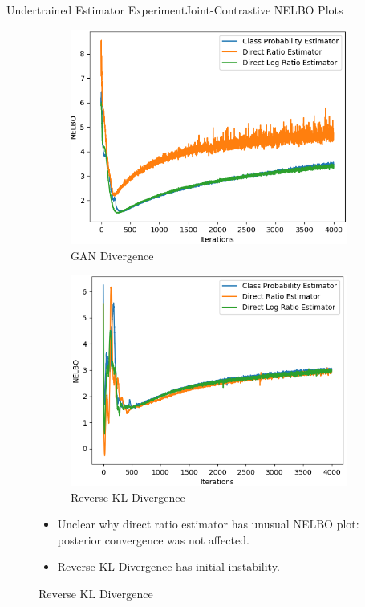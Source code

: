 \documentclass[handout]{beamer}
\begin{document}
\begin{frame}{Undertrained Estimator Experiment}{Joint-Contrastive NELBO Plots}
\begin{figure}
\begin{subfigure}{0.49\textwidth}
\includegraphics[width=\linewidth]{part2nelbos/JCADVvsJCADVexpvsJCADVgudlog.png}
\caption{GAN Divergence}
\end{subfigure}
\begin{subfigure}{0.49\textwidth}
\includegraphics[width=\linewidth]{part2nelbos/JCKLDvsJCKLexpvsJCKLgudlog.png}
\caption{Reverse KL Divergence}
\end{subfigure}
\begin{itemize}
\item Unclear why direct ratio estimator has unusual NELBO plot: posterior convergence was not affected.
\item Reverse KL Divergence has initial instability.
\end{itemize}
\end{figure}
\end{frame}
\end{document}
